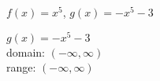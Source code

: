 {$f(x) = x^5$, $g(x) = -x^{5} - 3$
}
{$g(x) = -x^{5} - 3$\\
domain: $(-\infty, \infty)$\\
range: $(-\infty, \infty)$

\begin{center}
\end{center}}